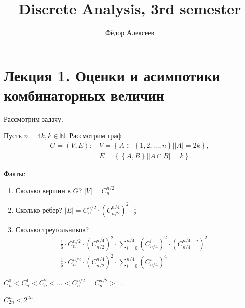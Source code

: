 



\title{Discrete Analysis, 3rd semester}

\author{Фёдор Алексеев}


\maketitle
\gitlink{}
\tableofcontents\newpage{}

\part{Лекция 1. Оценки и асимпотики комбинаторных величин}

\begin{example} Рассмотрим задачу.

  Пусть $n = 4k, k \in \mathbb{N}$. Рассмотрим граф 
  \begin{align*}
	G = (V,E)\mbox{: } &V = \left\{A \subset \left\{1, 2, \ldots, n\right\}| |A| = 2k\right\}, \\
	&E = \left\{ \left\{ A,B \right\}| |A \cap B| = k \right\}.
  \end{align*}

  Факты:
  \begin{enumerate}
	\item Сколько вершин в $G$? $|V| = C_n^{n/2}$
	\item Сколько рёбер? $|E| = C_n^{n/2} \cdot \left( C_{n/2}^{n/4} \right)^2 \cdot \frac{1}{2}$
	\item Сколько треугольников? 
	  \begin{align*}
		&\frac{1}{6} \cdot C_n^{n/2} \cdot \left( C_{n/2}^{n/4} \right)^2 \cdot 
		\sum_{i=0}^{n/4}\left( C_{n/4}^{i} \right)^2 \cdot \left( C_{n/4}^{n/4-i} \right)^2 = \\
		&\frac{1}{6} \cdot C_n^{n/2} \cdot \left( C_{n/2}^{n/4} \right)^2 \cdot \sum_{i=0}^{n/4}\left( C_{n/4}^{i} \right)^4
	  \end{align*}
  \end{enumerate}
\end{example}

\begin{claim}
  \(
	C_{n}^{0} < C_{n}^{1} < C_{n}^{2} < \ldots < C_{n}^{n/2} = C_{n}^{n/2} > \ldots
  \).
\end{claim}

\begin{claim}
  $C_{2n}^{n} < 2^{2n}$.
\end{claim}

